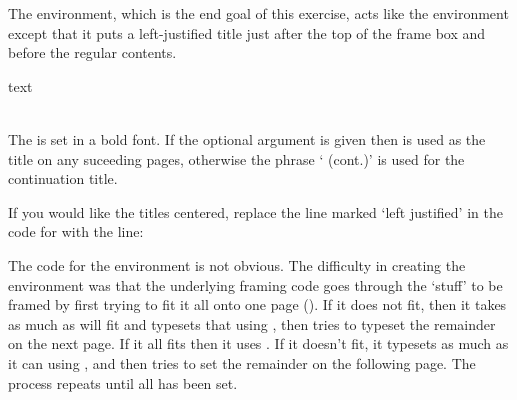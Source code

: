 \begin{lcode}
\newcommand{\FrameTitle}[2]{%
  \fboxrule=\FrameRule \fboxsep=\FrameSep
  \fbox{\vbox{\nobreak \vskip -0.7\FrameSep
    \rlap{\strut#1}\nobreak\nointerlineskip%
    \vskip 0.7\FrameSep
    \hbox{#2}}}}
\newenvironment{framewithtitle}[2][\FrameFirst@Lab\ (cont.)]{%
  \def\FrameFirst@Lab{\textbf{#2}}%
  \def\FrameCont@Lab{\textbf{#1}}%
  \def\FrameCommand##1{%
    \FrameTitle{\FrameFirst@Lab}{##1}}%
  \def\FirstFrameCommand##1{%
    \FrameTitle{\FrameFirst@Lab}{##1}}%
  \def\MidFrameCommand##1{%
    \FrameTitle{\FrameCont@Lab}{##1}}%
  \def\LastFrameCommand##1{%
    \FrameTitle{\FrameCont@Lab}{##1}}%
  \MakeFramed{\advance\hsize-\width \FrameRestore}}%
  {\endMakeFramed}
\end{lcode}

The  environment, which is the end goal of this
exercise, acts like the  environment except that it puts
a left-justified title just after the top of the frame box and before the
regular contents.
\begin{syntax}
 text \\
  \\
\end{syntax}
The  is set in a bold font. If the optional 
argument is given then  is used as the title on
any suceeding pages, otherwise the phrase ` (cont.)' is used
for the continuation title.

    If you would like the titles centered, replace the line 
marked `left justified' in the code for \cmd{\FrameTitle} with the line:
\begin{lcode}
\nobreak\nointerlineskip%
\end{lcode}

    The code for the  environment is not obvious. The difficulty
in creating the environment was that the underlying framing code goes through
the `stuff' to be framed by first trying to fit it all onto one page 
(). If it does not fit, then it takes as much as will fit
and typesets that using , then tries to typeset the 
remainder on the next page. If it all fits then it uses .
If it doesn't fit, it typesets as much as it can using , 
and then tries to set the remainder on the following page. The process repeats
until all has been set.

